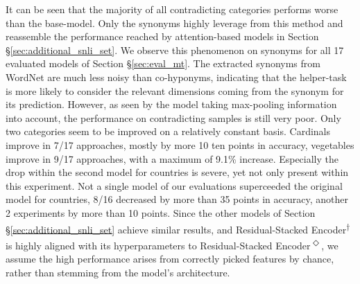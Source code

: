 It can be seen that the majority of all contradicting categories performs worse than the base-model. Only the synonyms highly leverage from this method and reassemble the performance reached by attention-based models in Section §\ref{sec:additional_snli_set}. We observe this phenomenon on synonyms for all 17 evaluated models of Section §\ref{sec:eval_mt}. The extracted synonyms from WordNet are much less noisy than co-hyponyms, indicating that the helper-task is more likely to consider the relevant dimensions coming from the synonym for its prediction. However, as seen by the model taking max-pooling information into account, the performance on contradicting samples is still very poor. Only two categories seem to be improved on a relatively constant basis. Cardinals improve in 7/17 approaches, mostly by more 10 ten points in accuracy, vegetables improve in 9/17 approaches, with a maximum of 9.1\% increase. Especially the drop within the second model for countries is severe, yet not only present within this experiment. Not a single model of our evaluations superceeded the original model for countries, 8/16 decreased by more than 35 points in accuracy, another 2 experiments by more than 10 points. Since the other models of Section §\ref{sec:additional_snli_set} achieve similar results, and Residual-Stacked Encoder\textsuperscript{$\dagger$} is highly aligned with its hyperparameters to Residual-Stacked Encoder\textsuperscript{$\Diamond$}, we assume the high performance arises from correctly picked features by chance, rather than stemming from the model's architecture. 

